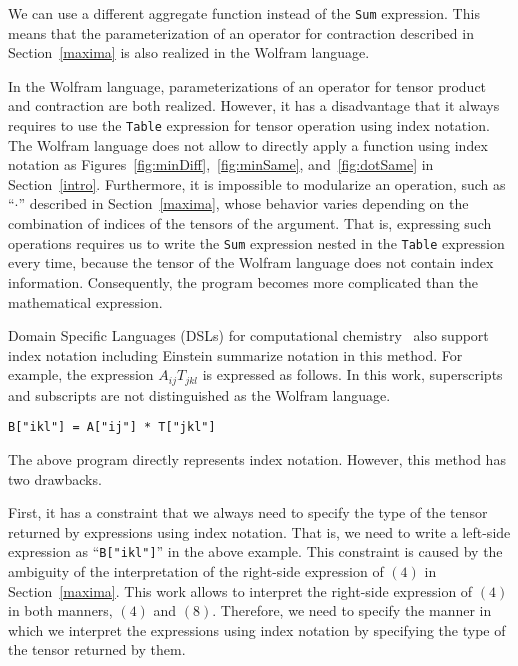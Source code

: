\documentclass[acmlarge]{acmart}
\begin{document}
We can use a different aggregate function instead of the \texttt{Sum} expression.
This means that the parameterization of an operator for contraction described in Section~\ref{maxima} is also realized in the Wolfram language.

In the Wolfram language, parameterizations of an operator for tensor product and contraction are both realized.
However, it has a disadvantage that it always requires to use the \texttt{Table} expression for tensor operation using index notation.
The Wolfram language does not allow to directly apply a function using index notation as Figures~\ref{fig:minDiff},~\ref{fig:minSame}, and~\ref{fig:dotSame} in Section~\ref{intro}.
Furthermore, it is impossible to modularize an operation, such as ``$\cdot$'' described in Section~\ref{maxima}, whose behavior varies depending on the combination of indices of the tensors of the argument.
That is, expressing such operations requires us to write the \texttt{Sum} expression nested in the \texttt{Table} expression every time, because the tensor of the Wolfram language does not contain index information.
Consequently, the program becomes more complicated than the mathematical expression.

Domain Specific Languages (DSLs) for computational chemistry~\cite{solomonik2015sparse} also support index notation including Einstein summarize notation in this method.
For example, the expression $A_{ij} T_{jkl}$ is expressed as follows.
In this work, superscripts and subscripts are not distinguished as the Wolfram language.

{\footnotesize
\begin{verbatim}
B["ikl"] = A["ij"] * T["jkl"]
\end{verbatim}
}

The above program directly represents index notation.
However, this method has two drawbacks.

First, it has a constraint that we always need to specify the type of the tensor returned by expressions using index notation.
That is, we need to write a left-side expression as ``\texttt{B["ikl"]}'' in the above example.
This constraint is caused by the ambiguity of the interpretation of the right-side expression of $(4)$ in Section~\ref{maxima}.
This work allows to interpret the right-side expression of $(4)$ in both manners, $(4)$ and $(8)$.
Therefore, we need to specify the manner in which we interpret the expressions using index notation by specifying the type of the tensor returned by them.
\end{document}
